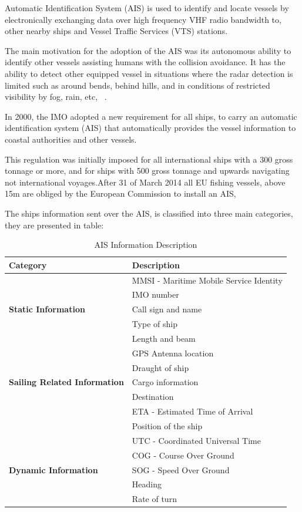 Automatic Identification System (AIS) is used to identify and locate vessels by electronically exchanging data over high frequency VHF radio bandwidth to, other nearby ships and Vessel Traffic Services (VTS) stations.

The main motivation for the adoption of the AIS was its autonomous ability to identify other vessels assisting humans with the collision avoidance. It has the ability to detect other equipped vessel in situations where the radar detection is limited such as around bends, behind hills, and in conditions of restricted visibility by fog, rain, etc, ~\cite{Harati-Mokhtari2007}. 

In 2000, the IMO adopted a new requirement for all ships, to carry an automatic identification system (AIS) that automatically provides the vessel information to coastal authorities and other vessels.

This regulation was initially imposed for all international ships with a 300 gross tonnage or more, and for ships with 500 gross tonnage and upwards navigating not international voyages.After 31 of March 2014 all EU fishing vessels, above 15m are obliged by the European Commission to install an AIS, ~\cite{EC2018}

The ships information sent over the AIS, is classified into three main categories, they are presented in table:
\begin{table}[H]
\centering
\caption{AIS Information Description}
\label{Table: AIS Categories}
\begin{tabular}{|l|l|}
\hline
\textbf{Category} & \textbf{Description} \\ \hline
 & MMSI - Maritime Mobile Service Identity \\ \cline{2-2} 
 & IMO number \\ \cline{2-2} 
\textbf{Static Information} & Call sign and name \\ \cline{2-2} 
 & Type of ship \\ \cline{2-2} 
 & Length and beam \\ \cline{2-2} 
 & GPS Antenna location \\ \hline
 & Draught of ship \\ \cline{2-2} 
\textbf{Sailing Related Information} & Cargo information \\ \cline{2-2} 
 & Destination \\ \cline{2-2} 
 & ETA - Estimated Time of Arrival \\ \hline
 & Position of the ship \\ \cline{2-2} 
 & UTC - Coordinated Universal Time \\ \cline{2-2} 
 & COG - Course Over Ground \\ \cline{2-2} 
\textbf{Dynamic Information} & SOG - Speed Over Ground \\ \cline{2-2} 
 & Heading \\ \cline{2-2} 
 & Rate of turn \\ \hline
\end{tabular}
\end{table}

